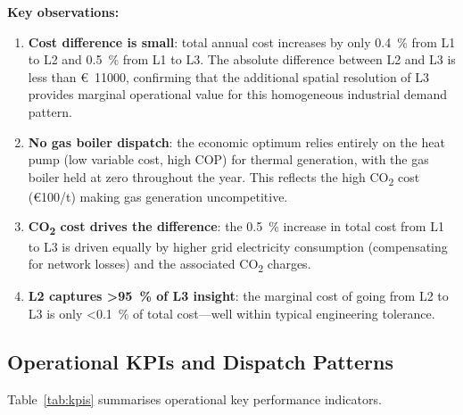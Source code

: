 \documentclass[a4paper,fleqn]{cas-sc}
\begin{document}
\textbf{Key observations:}

\begin{enumerate}
  \item \textbf{Cost difference is small}: total annual cost increases by
        only \SI{0.4}{\percent} from L1 to L2 and \SI{0.5}{\percent} from L1
        to L3.  The absolute difference between L2 and L3 is less than
        \SI{11000}[\euro]{}, confirming that the additional spatial resolution
        of L3 provides marginal operational value for this homogeneous
        industrial demand pattern.

  \item \textbf{No gas boiler dispatch}: the economic optimum relies entirely
        on the heat pump (low variable cost, high COP) for thermal generation,
        with the gas boiler held at zero throughout the year.  This reflects
        the high CO\textsubscript{2} cost (\euro{}100/t) making gas generation
        uncompetitive.

  \item \textbf{CO\textsubscript{2} cost drives the difference}: the
        \SI{+0.5}{\percent} increase in total cost from L1 to L3 is driven
        equally by higher grid electricity consumption (compensating for
        network losses) and the associated CO\textsubscript{2} charges.

  \item \textbf{L2 captures \SI{>95}{\percent} of L3 insight}: the marginal
        cost of going from L2 to L3 is only \SI{<0.1}{\percent} of total
        cost---well within typical engineering tolerance.
\end{enumerate}

\subsection{Operational KPIs and Dispatch Patterns}

Table~\ref{tab:kpis} summarises operational key performance indicators.
\end{document}
